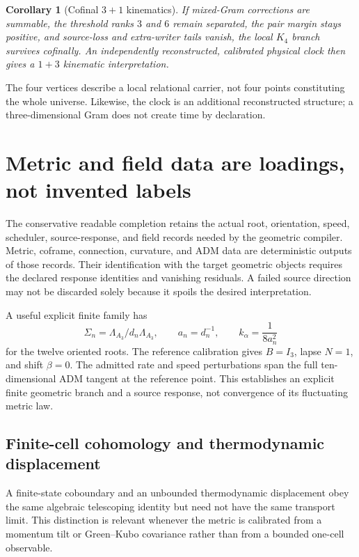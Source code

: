 \documentclass[11pt,a4paper,oneside]{book}
\theoremstyle{plain}
\newtheorem{corollary}[theorem]{Corollary}
\theoremstyle{definition}
\theoremstyle{remark}
\newcommand{\src}[2]{\cite{#1}}
\begin{document}
\begin{corollary}[Cofinal $3+1$ kinematics]
\label{cor:3plus1}
If mixed-Gram corrections are summable, the threshold ranks $3$ and $6$ remain separated, the pair margin stays positive, and source-loss and extra-writer tails vanish, the local $K_4$ branch survives cofinally. An independently reconstructed, calibrated physical clock then gives a $1+3$ kinematic interpretation.
\end{corollary}
\src{GT}{cor:dimension-cofinal-3plus1}
The four vertices describe a local relational carrier, not four points constituting the whole universe. Likewise, the clock is an additional reconstructed structure; a three-dimensional Gram does not create time by declaration.

\section{Metric and field data are loadings, not invented labels}
The conservative readable completion retains the actual root, orientation, speed, scheduler, source-response, and field records needed by the geometric compiler. Metric, coframe, connection, curvature, and ADM data are deterministic outputs of those records. Their identification with the target geometric objects requires the declared response identities and vanishing residuals. A failed source direction may not be discarded solely because it spoils the desired interpretation.

A useful explicit finite family has
\begin{equation}
 \Sigma_n=\Lambda_{A_3}/d_n\Lambda_{A_3},\qquad a_n=d_n^{-1},
 \qquad k_\alpha=\frac1{8a_n^2}
 \label{eq:a3-rates}
\end{equation}
for the twelve oriented roots. The reference calibration gives $B=I_3$, lapse $N=1$, and shift $\beta=0$. The admitted rate and speed perturbations span the full ten-dimensional ADM tangent at the reference point. This establishes an explicit finite geometric branch and a source response, not convergence of its fluctuating metric law. \cite{GT}

\subsection{Finite-cell cohomology and thermodynamic displacement}
A finite-state coboundary and an unbounded thermodynamic displacement obey the
same algebraic telescoping identity but need not have the same transport
limit.  This distinction is relevant whenever the metric is calibrated from a
momentum tilt or Green--Kubo covariance rather than from a bounded one-cell
observable.
\end{document}
